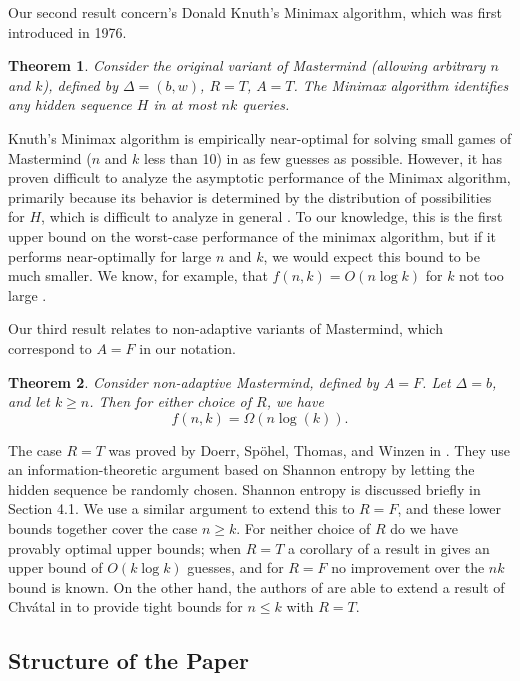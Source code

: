 \documentclass[12pt, a4paper]{article}
\newtheorem{theorem}{Theorem}
\begin{document}
Our second result concern's Donald Knuth's Minimax algorithm, which was first introduced in 1976.
\begin{theorem}\label{minimaxTheorem}
	Consider the original variant of Mastermind (allowing arbitrary $n$ and $k$), defined by $\Delta=(b, w)$, $R=T$, $A=T$. The Minimax algorithm identifies any hidden sequence $H$ in at most $nk$ queries.
\end{theorem}
Knuth's Minimax algorithm is empirically near-optimal for solving small games of Mastermind ($n$ and $k$ less than 10) in as few guesses as possible. However, it has proven difficult to analyze the asymptotic performance of the Minimax algorithm, primarily because its behavior is determined by the distribution of possibilities for $H$, which is difficult to analyze in general  \cite{OS13, KT86}. To our knowledge, this is the first upper bound on the worst-case performance of the minimax algorithm, but if it performs near-optimally for large $n$ and $k$, we would expect this bound to be much smaller. We know, for example, that $f(n,k) = O(n \log k)$ for $k$ not too large \cite{DK76, KT86}.

Our third result relates to non-adaptive variants of Mastermind, which correspond to $A=F$ in our notation.
\begin{theorem}\label{nonAdaptiveTheorem}
Consider non-adaptive Mastermind, defined by $A=F$. Let $\Delta = b$, and let $k \geq n$. Then for either choice of $R$, we have
	\begin{equation*}
		f(n, k) = \Omega\left( n\log(k)\right).
	\end{equation*}
\end{theorem}
The case $R = T$ was proved by Doerr, Sp\"ohel, Thomas, and Winzen in \cite{DS13}. They use an information-theoretic argument based on Shannon entropy by letting the hidden sequence be randomly chosen. Shannon entropy is discussed briefly in Section 4.1.
We use a similar argument to extend this to $R = F$, and
these lower bounds together cover the case $n \geq k$. For neither choice of $R$ do we have provably optimal upper bounds; when $R = T$ a corollary of a result in \cite{DS13} gives an upper bound of $O(k \log k)$ guesses, and for $R = F$ no improvement over the $nk$ bound is known. On the other hand, the authors of \cite{DS13} are able to extend a result of Chv\'atal in \cite{VC83} to provide tight bounds for $n \le k$ with $R = T$.
\subsection{Structure of the Paper}
\end{document}
